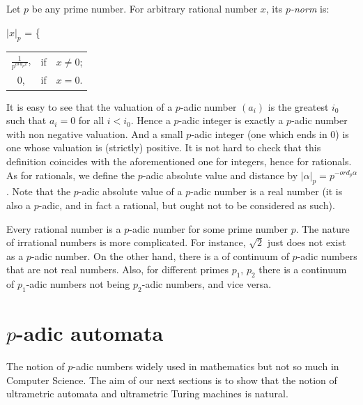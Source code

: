 \documentclass{llncs}
\begin{document}
\begin{definition}
Let $p$ be any prime number. For arbitrary rational number $x$, its {\em $p$-norm} is:
\begin{center}
$|x|_p$ = \{
            \begin{tabular}{ccc}
            $\frac{1}{p^{ord_p x}}$, &  if  & $x \neq 0$;\\
            0,        &   if  & $x = 0$.\\
            \end{tabular}
\end{center}
\end{definition}

It is easy to see that the valuation of a $p$-adic number $(a_i)$ is the greatest $i_0$ such that $a_i = 0$ for all $i < i_0$. Hence a $p$-adic integer is exactly a $p$-adic number with non negative valuation. And a small $p$-adic integer (one which ends in 0) is one whose valuation is (strictly) positive. It is not hard to check that this definition coincides with the aforementioned one for integers, hence for rationals. As for rationals, we define the $p$-adic absolute value and distance by $|\alpha |_p = p^{- ord_p \alpha }$. Note that the $p$-adic absolute value of a $p$-adic number is a real number (it is also a $p$-adic, and in fact a rational, but ought not to be considered as such).

Every rational number is a $p$-adic number for some prime number $p$. The nature of irrational numbers is more complicated. For instance, $\sqrt{2}$ just does not exist as a $p$-adic number. On the other hand, there is a of continuum of $p$-adic numbers that are not real numbers. Also, for different primes $p_1$, $p_2$ there is a continuum of $p_1$-adic numbers not being $p_2$-adic numbers, and vice versa.

\section{$p$-adic automata}


The notion of $p$-adic numbers widely used in mathematics but not so much in Computer Science. The aim of our next sections is to show that the notion of ultrametric automata and ultrametric Turing machines is natural. 
\end{document}
